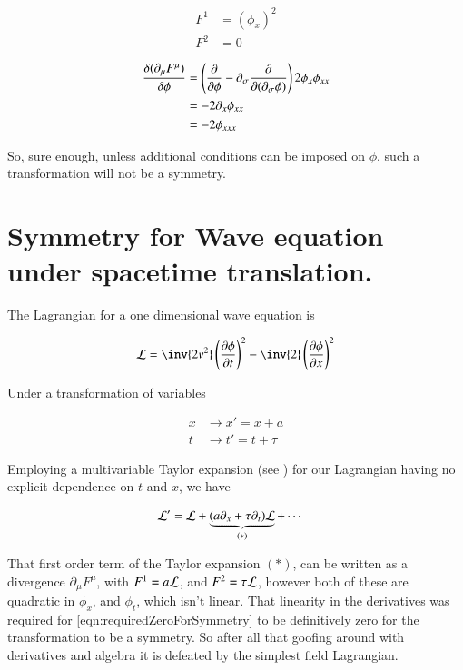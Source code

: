 \documentclass{article}
\begin{document}
\begin{align*}
F^1 &= (\phi_x)^2 \\
F^2 &= 0
\end{align*}

\begin{align*}
\frac{\delta (\partial_\mu F^\mu)}{\delta \phi} 
&=
\left(\frac{\partial {}}{\partial {\phi}} - \partial_\sigma \frac{\partial {}}{\partial {(\partial_\sigma \phi)}}\right) 2 \phi_x \phi_{xx} \\
&=
- 2 \partial_x \phi_{xx} \\
&=
- 2 \phi_{xxx} \\
\end{align*}

So, sure enough, unless additional conditions can be imposed on $\phi$, such a transformation
will not be a symmetry.

\section{ Symmetry for Wave equation under spacetime translation. }


The Lagrangian for a one dimensional wave equation is

\begin{align}\label{eqn:oneDimWave}
\LL = 
\inv{2 v^2} \left(\PD{t}{\phi}\right)^2 - \inv{2} \left(\PD{x}{\phi}\right)^2
\end{align}

Under a transformation of variables 

\begin{align*}
x &\rightarrow x' = x + a \\
t &\rightarrow t' = t + \tau 
\end{align*}

Employing a multivariable Taylor expansion
(see 
\cite{PJmultiTaylors}
)
for our Lagrangian having no explicit dependence on $t$ and $x$, we have

\begin{align*}
\mathcal{L}' &= \mathcal{L} + \underbrace{(a \partial_x + \tau \partial_t)\mathcal{L}}_{(*)} + \cdots
\end{align*}

That first order term of the Taylor expansion $(*)$, 
can be written as a divergence $\partial_\mu F^\mu$, with $F^1 = a \mathcal{L}$, and $F^2 = \tau\mathcal{L}$, however
both of these are quadratic in $\phi_x$, and $\phi_t$, which isn't linear.
That linearity in the derivatives was required for \ref{eqn:requiredZeroForSymmetry} to be 
definitively zero for the transformation to be a symmetry.  So after all that goofing around
with derivatives and algebra it is defeated by the
simplest field Lagrangian.
\end{document}
